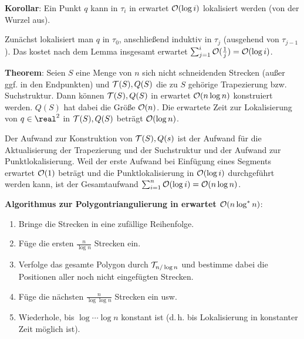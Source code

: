 \textbf{Korollar}:
Ein Punkt $q$ kann in $\tau_i$ in erwartet $\mathcal{O}(\log i)$ lokalisiert werden
(von der Wurzel aus).

\begin{Beweis}
    Zunächst lokalisiert man $q$ in $\tau_0$,
    anschließend induktiv in $\tau_j$ (ausgehend von $\tau_{j-1}$).
    Das kostet nach dem Lemma insgesamt erwartet $\sum_{j=1}^i \mathcal{O}(\frac{1}{j}) = \mathcal{O}(\log i)$.
\end{Beweis}

\textbf{Theorem}:
Seien $S$ eine Menge von $n$ sich nicht schneidenden Strecken
(außer ggf. in den Endpunkten) und $\mathcal{T}(S), Q(S)$ die
zu $S$ gehörige Trapezierung bzw. Suchstruktur.
Dann können $\mathcal{T}(S), Q(S)$ in erwartet $\mathcal{O}(n \log n)$ konstruiert werden.
$Q(S)$ hat dabei die Größe $\mathcal{O}(n)$.
Die erwartete Zeit zur Lokalisierung von $q \in \real^2$ in $\mathcal{T}(S), Q(S)$ beträgt $\mathcal{O}(\log n)$.

\begin{Beweis}
    Der Aufwand zur Konstruktion von $\mathcal{T}(S), Q(s)$ ist der Aufwand für die Aktualisierung der
    Trapezierung und der Suchstruktur und der Aufwand zur Punktlokalisierung.
    Weil der erste Aufwand bei Einfügung eines Segments erwartet $\mathcal{O}(1)$ beträgt und
    die Punktlokalisierung in $\mathcal{O}(\log i)$ durchgeführt werden kann,
    ist der Gesamtaufwand $\sum_{i=1}^n \mathcal{O}(\log i) = \mathcal{O}(n \log n)$.
\end{Beweis}

\linie
\pagebreak

\textbf{Algorithmus zur Polygontriangulierung in erwartet $\mathcal{O}(n \log^\ast n)$}:
\begin{enumerate}
    \item
    Bringe die Strecken in eine zufällige Reihenfolge.

    \item
    Füge die ersten $\frac{n}{\log n}$ Strecken ein.

    \item
    Verfolge das gesamte Polygon durch $\mathcal{T}_{n/\log n}$ und bestimme dabei die Positionen
    aller noch nicht eingefügten Strecken.

    \item
    Füge die nächsten $\frac{n}{\log \log n}$ Strecken ein usw.

    \item
    Wiederhole, bis $\log \dotsb \log n$ konstant ist
    (d.\,h. bis Lokalisierung in konstanter Zeit möglich ist).
\end{enumerate}

